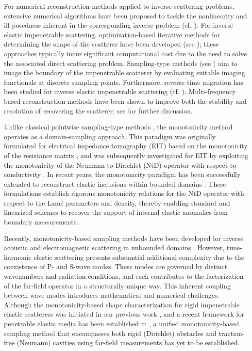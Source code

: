\documentclass[11pt,reqno,twoside]{amsart}
\theoremstyle{definition}
\theoremstyle{remark}
\numberwithin{equation}{section}
\begin{document}
For numerical reconstruction methods applied to inverse scattering problems, extensive numerical algorithms have been proposed to tackle the nonlinearity and ill-posedness inherent in the corresponding inverse problem (cf. \cite{CK19}). For inverse elastic impenetrable scattering, optimization-based iterative methods for determining the shape of the scatterer have been developed (see \cite{LWWZ16,DLL19,LY19}); these approaches typically incur significant computational cost due to the need to solve the associated direct scattering problem. Sampling-type methods (see \cite{Aren01,JLX18,LLS19,KG08,AK02,HKS12})  aim to image the boundary of the impenetrable scatterer by evaluating suitable imaging functionals at discrete sampling points. Furthermore, reverse time migration has been studied for inverse elastic impenetrable scattering (cf. \cite{CH15}). Multi-frequency based reconstruction methods have been shown to improve both the stability and resolution of recovering the scatterer; see \cite{BLLT15,BYZ19} for further discussion.

Unlike classical pointwise sampling-type methods \cite{CK19,KG08}, the monotonicity method operates as a domain-sampling approach. This paradigm was originally formulated for electrical impedance tomography (EIT) based on the monotonicity of the resistance matrix \cite{TR02}, and was subsequently investigated  for EIT by exploiting the monotonicity of the Neumann-to-Dirichlet (NtD) operator with respect to conductivity \cite{BU13}. In recent years, the monotonicity paradigm has been successfully extended to reconstruct elastic inclusions within bounded domains \cite{EH21, EH23, EP24}. These formulations establish rigorous monotonicity relations for the NtD operator with respect to the Lam\'{e} parameters and density, thereby enabling standard and linearized schemes to recover the support of internal elastic anomalies from boundary measurements.

Recently, monotonicity-based sampling methods have been developed for inverse acoustic and electromagnetic scattering in unbounded domains \cite{GB18,AG20,AG23}. However, time-harmonic elastic scattering presents substantial additional complexity due to the coexistence of P- and S-wave modes. These modes are governed by distinct wavenumbers and radiation conditions, and each contributes to the factorization of the far-field operator in a structurally unique way. This inherent coupling between wave modes introduces mathematical and numerical challenges. Although the monotonicity-based shape characterization for rigid impenetrable elastic scatterers was initiated in our previous work \cite{BDZ25}, and a recent framework for penetrable elastic media has been established in \cite{HX26}, a unified monotonicity-based sampling method that encompasses both rigid (Dirichlet) obstacles and traction-free (Neumann) cavities using far-field measurements has yet to be established. 
\end{document}
